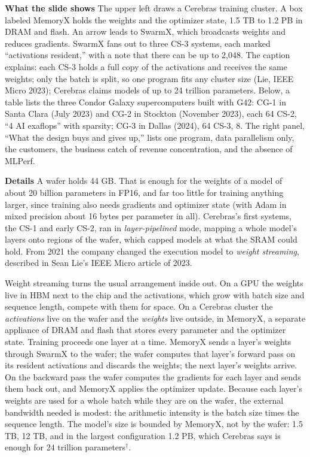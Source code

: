 \documentclass[11pt,letterpaper]{article}
\newcommand{\para}[1]{\medskip\noindent\textbf{#1}\quad}
\begin{document}
\para{What the slide shows} The upper left draws a Cerebras training cluster. A box labeled MemoryX holds the weights and the optimizer state, 1.5 TB to 1.2 PB in DRAM and flash. An arrow leads to SwarmX, which broadcasts weights and reduces gradients. SwarmX fans out to three CS-3 systems, each marked ``activations resident,'' with a note that there can be up to 2{,}048. The caption explains: each CS-3 holds a full copy of the activations and receives the same weights; only the batch is split, so one program fits any cluster size (Lie, IEEE Micro 2023); Cerebras claims models of up to 24 trillion parameters. Below, a table lists the three Condor Galaxy supercomputers built with G42: CG-1 in Santa Clara (July 2023) and CG-2 in Stockton (November 2023), each 64 CS-2, ``4 AI exaflops'' with sparsity; CG-3 in Dallas (2024), 64 CS-3, 8. The right panel, ``What the design buys and gives up,'' lists one program, data parallelism only, the customers, the business catch of revenue concentration, and the absence of MLPerf.

\para{Details} A wafer holds 44 GB. That is enough for the weights of a model of about 20 billion parameters in FP16, and far too little for training anything larger, since training also needs gradients and optimizer state (with Adam in mixed precision about 16 bytes per parameter in all). Cerebras's first systems, the CS-1 and early CS-2, ran in \emph{layer-pipelined} mode, mapping a whole model's layers onto regions of the wafer, which capped models at what the SRAM could hold. From 2021 the company changed the execution model to \emph{weight streaming}, described in Sean Lie's IEEE Micro article of 2023.

Weight streaming turns the usual arrangement inside out. On a GPU the weights live in HBM next to the chip and the activations, which grow with batch size and sequence length, compete with them for space. On a Cerebras cluster the \emph{activations} live on the wafer and the \emph{weights} live outside, in MemoryX, a separate appliance of DRAM and flash that stores every parameter and the optimizer state. Training proceeds one layer at a time. MemoryX sends a layer's weights through SwarmX to the wafer; the wafer computes that layer's forward pass on its resident activations and discards the weights; the next layer's weights arrive. On the backward pass the wafer computes the gradients for each layer and sends them back out, and MemoryX applies the optimizer update. Because each layer's weights are used for a whole batch while they are on the wafer, the external bandwidth needed is modest: the arithmetic intensity is the batch size times the sequence length. The model's size is bounded by MemoryX, not by the wafer: 1.5 TB, 12 TB, and in the largest configuration 1.2 PB, which Cerebras says is enough for 24 trillion parameters$^\dagger$.
\end{document}
